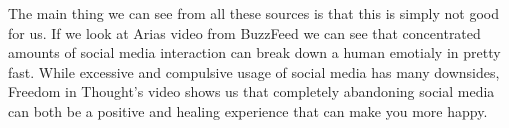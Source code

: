 \documentclass[11pt]{article}
\begin{document}
The main thing we can see from all these sources is that this is simply not good for us.
If we look at Arias video from BuzzFeed we can see that concentrated amounts of social
media interaction can break down a human emotialy in pretty fast. While excessive and
compulsive usage of social media has many downsides, Freedom in Thought’s video shows
us that completely abandoning social media can both be a positive and healing experience
that can make you more happy.


\pagebreak
{\RaggedRight
  
  
}
\end{document}
